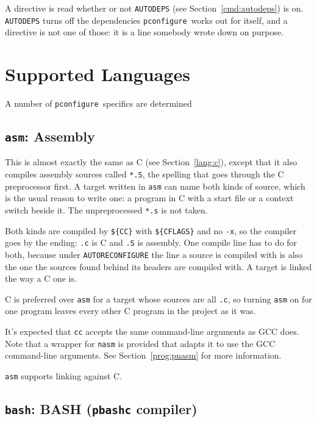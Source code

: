 \documentclass{article}
\newcommand{\pconfigure}{\texttt{pconfigure}}
\begin{document}
A directive is read whether or not \texttt{AUTODEPS} (see
Section~\ref{cmd:autodeps}) is on.  \texttt{AUTODEPS} turns off the
dependencies \pconfigure\ works out for itself, and a directive is
not one of those: it is a line somebody wrote down on purpose.

\section{Supported Languages \label{lang}}

A number of \pconfigure\ specifics are determined

\subsection{\texttt{asm}: Assembly}

This is almost exactly the same as C (see Section~\ref{lang:c}),
except that it also compiles assembly sources called \texttt{*.S},
the spelling that goes through the C preprocessor first.  A target
written in \texttt{asm} can name both kinds of source, which is the
usual reason to write one: a program in C with a start file or a
context switch beside it.  The unpreprocessed \texttt{*.s} is not
taken.

Both kinds are compiled by \texttt{\$\{CC\}} with \texttt{\$\{CFLAGS\}}
and no \texttt{-x}, so the compiler goes by the ending: \texttt{.c} is
C and \texttt{.S} is assembly.  One compile line has to do for both,
because under \texttt{AUTORECONFIGURE} the line a source is compiled
with is also the one the sources found behind its headers are compiled
with.  A target is linked the way a C one is.

C is preferred over \texttt{asm} for a target whose sources are all
\texttt{.c}, so turning \texttt{asm} on for one program leaves every
other C program in the project as it was.

It's expected that \texttt{cc} accepts the same command-line arguments
as GCC does.  Note that a wrapper for \texttt{nasm} is provided that
adapts it to use the GCC command-line arguments.  See
Section~\ref{prog:pnasm} for more information.

\texttt{asm} supports linking against C.

\subsection{\texttt{bash}: BASH (\texttt{pbashc} compiler) \label{lang:bash}}
\end{document}
